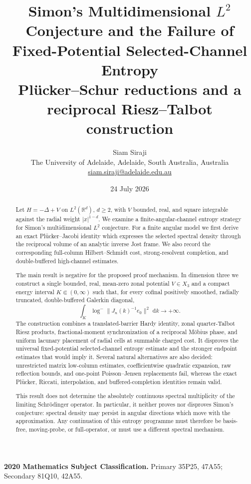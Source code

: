 \documentclass[11pt]{article}
\title{\textbf{Simon's Multidimensional $L^2$ Conjecture and the Failure of Fixed-Potential Selected-Channel Entropy}\\[4pt]
\large Pl\"ucker--Schur reductions and a reciprocal Riesz--Talbot construction}
\author{Siam Siraji\\[3pt]
\small The University of Adelaide, Adelaide, South Australia, Australia\\
\small \href{mailto:siam.siraji@adelaide.edu.au}{siam.siraji@adelaide.edu.au}}
\date{24 July 2026}
\newcommand{\dd}{\,\mathrm d}
\theoremstyle{definition}
\theoremstyle{remark}
\begin{document}
\maketitle

\begin{abstract}
Let $H=-\Delta+V$ on $L^2(\mathbb R^d)$, $d\geq2$, with $V$ bounded,
real, and square integrable against the radial weight $|x|^{1-d}$.
We examine a finite-angular-channel entropy strategy for Simon's
multidimensional $L^2$ conjecture.  For a finite angular model we first
derive an exact Pl\"ucker--Jacobi identity which expresses the selected
spectral density through the reciprocal volume of an analytic inverse Jost
frame.  We also record the corresponding full-column Hilbert--Schmidt cost,
strong-resolvent completion, and double-buffered high-channel estimates.

The main result is negative for the proposed proof mechanism.  In dimension
three we construct a single bounded, real, mean-zero zonal potential
$V\in X_3$ and a compact energy interval $K\Subset(0,\infty)$ such that, for
every cofinal positively smoothed, radially truncated, double-buffered
Galerkin diagonal,
\[
 \int_K\log^-\|J_n(k)^{-1}e_0\|^2\,\dd k\longrightarrow+\infty .
\]
The construction combines a translated-barrier Hardy identity, zonal
quarter-Talbot Riesz products, fractional-moment synchronization of a
reciprocal M\"obius phase, and uniform lacunary placement of radial cells at
summable charged cost.  It disproves the universal fixed-potential
selected-channel entropy estimate and the stronger endpoint estimates that
would imply it.  Several natural alternatives are also decided: unrestricted
matrix low-column estimates, coefficientwise quadratic expansion, raw
reflection bounds, and one-point Poisson--Jensen replacements fail, whereas
the exact Pl\"ucker, Riccati, interpolation, and buffered-completion
identities remain valid.

This result does not determine the absolutely continuous spectral
multiplicity of the limiting Schr\"odinger operator.  In particular, it
neither proves nor disproves Simon's conjecture: spectral density may persist
in angular directions which move with the approximation.  Any continuation
of this entropy programme must therefore be basis-free, moving-probe, or
full-operator, or must use a different spectral mechanism.
\end{abstract}

\noindent\textbf{2020 Mathematics Subject Classification.}
Primary 35P25, 47A55; Secondary 81Q10, 42A55.
\end{document}
